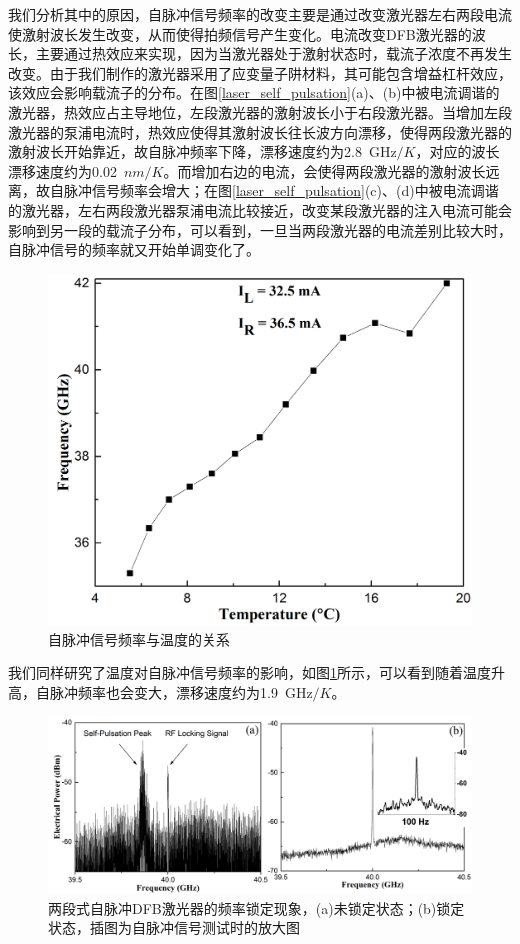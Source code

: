 我们分析其中的原因，自脉冲信号频率的改变主要是通过改变激光器左右两段电流使激射波长发生改变，从而使得拍频信号产生变化。电流改变DFB激光器的波长，主要通过热效应来实现，因为当激光器处于激射状态时，载流子浓度不再发生改变。由于我们制作的激光器采用了应变量子阱材料，其可能包含增益杠杆效应\cite{vahala1989optical}，该效应会影响载流子的分布。在图\ref{laser_self_pulsation}(a)、(b)中被电流调谐的激光器，热效应占主导地位，左段激光器的激射波长小于右段激光器。当增加左段激光器的泵浦电流时，热效应使得其激射波长往长波方向漂移，使得两段激光器的激射波长开始靠近，故自脉冲频率下降，漂移速度约为2.8~GHz$/K$，对应的波长漂移速度约为0.02~$nm/K$。而增加右边的电流，会使得两段激光器的激射波长远离，故自脉冲信号频率会增大；在图\ref{laser_self_pulsation}(c)、(d)中被电流调谐的激光器，左右两段激光器泵浦电流比较接近，改变某段激光器的注入电流可能会影响到另一段的载流子分布，可以看到，一旦当两段激光器的电流差别比较大时，自脉冲信号的频率就又开始单调变化了。

\begin{figure}[htb]
	\centering
	\includegraphics[width=12cm]{./Pictures/laser_temperature.jpg}
	\captionsetup{justification=centering}
	\caption{自脉冲信号频率与温度的关系}
	\label{laser_temperature}
\end{figure}

我们同样研究了温度对自脉冲信号频率的影响，如图\ref{laser_temperature}所示，可以看到随着温度升高，自脉冲频率也会变大，漂移速度约为1.9~GHz$/K$。

\begin{figure}[htb]
	\centering
	\includegraphics[width=15cm]{./Pictures/laser_lock.jpg}
	\captionsetup{justification=centering}
	\caption{两段式自脉冲DFB激光器的频率锁定现象，(a)未锁定状态；(b)锁定状态，插图为自脉冲信号测试时的放大图}
	\label{laser_lock}
\end{figure}

